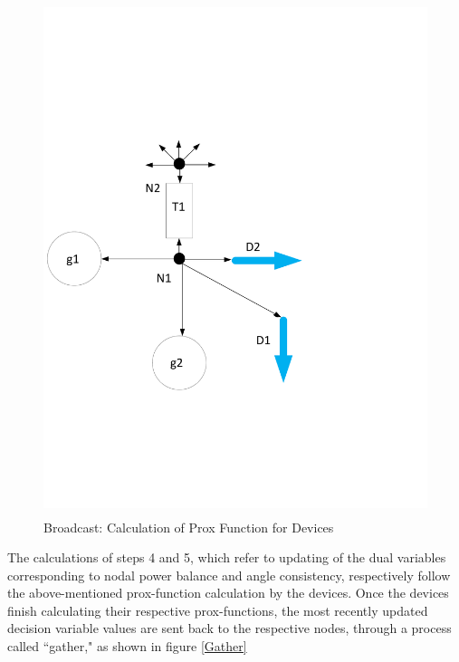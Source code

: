 \documentclass[preprint,12pt,3p]{elsarticle}
\begin{document}
	\begin{figure}
		\begin{center}
			\vspace*{-4cm}
			\includegraphics[height=15cm,width=20cm]{Prox_OPF.pdf}
			\caption{Broadcast: Calculation of Prox Function for Devices}
			\label{Broadcast}
		\end{center}
	\end{figure}
	The calculations of steps 4 and 5, which refer to updating of the dual variables corresponding to nodal power balance and angle consistency, respectively follow the above-mentioned prox-function calculation by the devices. Once the devices finish calculating their respective prox-functions, the most recently updated decision variable values are sent back to the respective nodes, through a process called ``gather," as shown in figure \ref{Gather}
\end{document}
